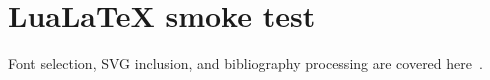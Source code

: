 \documentclass{article}
\begin{document}
\section*{LuaLaTeX smoke test}
Font selection, SVG inclusion, and bibliography processing are covered here~\cite{texlive}.


\printbibliography
\end{document}
